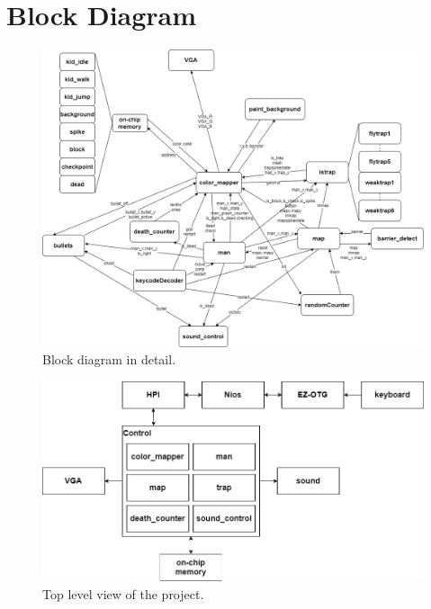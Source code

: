 \documentclass[12pt]{article}
\begin{document}
\section{Block Diagram}
\begin{figure}[H]
    \centering
    \includegraphics[width=17cm]{BlockDiagram.png}
    \caption{Block diagram in detail.}
\end{figure}
\begin{figure}[H]
    \centering
    \includegraphics[width=16cm]{TopLevelView.png}
    \caption{Top level view of the project.}
\end{figure}
\end{document}
